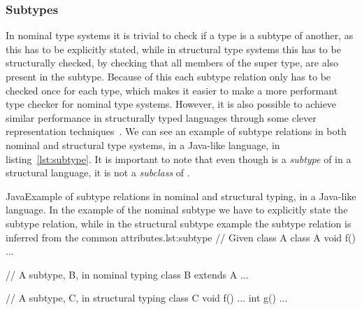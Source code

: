 \subsubsection{Subtypes}\label{subsubsec:subtypes}

In nominal type systems it is trivial to check if a type is a subtype of another, as this has to be explicitly stated, while in structural type systems this has to be structurally checked, by checking that all members of the super type, are also present in the subtype.
Because of this each subtype relation only has to be checked once for each type, which makes it easier to make a more performant type checker for nominal type systems.
However, it is also possible to achieve similar performance in structurally typed languages through some clever representation techniques~\cite{tapl}. %
We can see an example of subtype relations in both nominal and structural type systems, in a Java-like language, in listing~\vref{lst:subtype}.
It is important to note that even though  is a \emph{subtype} of  in a structural language, it is not a \emph{subclass} of .

\begin{code}{Java}{Example of subtype relations in nominal and structural typing, in a Java-like language. In the example of the nominal subtype we have to explicitly state the subtype relation, while in the structural subtype example the subtype relation is inferred from the common attributes.}{lst:subtype}
    // Given class A
    class A {
        void f() { ... }
     }

    // A subtype, B, in nominal typing
    class B extends A { ... }

    // A subtype, C, in structural typing
    class C {
        void f() { ... }
        int g() { ... }
    }
\end{code}

